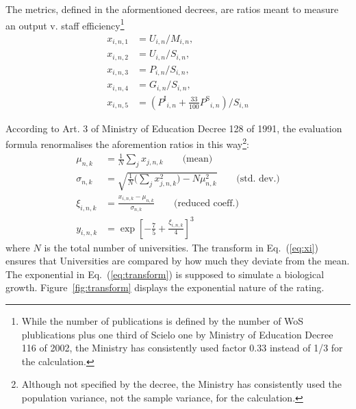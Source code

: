\documentclass[twocolumn]{article}
\def\npup{\ensuremath{U}}
\def\nmaj{\ensuremath{M}}
\def\nprof{\ensuremath{S}}
\def\ngrad{\ensuremath{P}}
\def\ngrant{\ensuremath{G}}
\def\nisi{\ensuremath{P^\text{I}}}
\def\nscielo{\ensuremath{P^\text{S}}}
\def\eqref#1{Eq.~(\ref{eq:#1})}
\begin{document}
The metrics, defined in the aformentioned decrees, are ratios meant to measure an output v. staff efficiency\footnote{While the number of publications is defined by the number of WoS plublications plus one third of Scielo one by Ministry of Education Decree 116 of 2002, the Ministry has consistently used factor 0.33 instead of 1/3 for the calculation.}
\begin{subequations}
\begin{align}
    x_{i,n,1} &= \npup_{i,n} / \nmaj_{i,n},  \label{eq:x1}             \\
    x_{i,n,2} &= \npup_{i,n} / \nprof_{i,n},                           \\ 
    x_{i,n,3} &= \ngrad_{i,n} / \nprof_{i,n},                          \\
    x_{i,n,4} &= \ngrant_{i,n} / \nprof_{i,n},                         \\
    x_{i,n,5} &= (\nisi_{i,n} + \frac{33}{100} \nscielo_{i,n}) / \nprof_{i,n}
\end{align}
\end{subequations}

According to Art. 3 of Ministry of Education Decree 128 of 1991,  the
evaluation formula renormalises the aforemention ratios in this
way\footnote{Although not specified by the decree, the Ministry has
consistently used the population variance, not the sample variance, for the calculation.}:
\begin{subequations}
\begin{align}
    \mu_{n,k}    &= \frac1N\sum_j x_{j,n,k}\qquad\text{(mean)} \label{eq:mu}\\
    \sigma_{n,k} &= \sqrt{\frac 1N \Big(\sum_j x_{j,n,k}^2\Big) - N\mu_{n,k}^2}\qquad\text{(std. dev.)} \label{eq:sigma}\\
    \xi_{i,n,k}  &= \frac{x_{i,n,k} - \mu_{n,k} }{\sigma_{n,k}} 
\qquad\text{(reduced coeff.)} \label{eq:xi}\\
    y_{i,n,k}    &= \exp \left[ -\frac 75 + \frac{\xi_{i,n,k}}4  \right]^3 \label{eq:transform}
\end{align}
\end{subequations}
where $N$ is the total number of universities.
The transform in \eqref{xi} ensures that Universities are compared by how much they deviate from the mean. The exponential in \eqref{transform} is supposed to simulate a biological growth. Figure~\ref{fig:transform} displays the exponential nature of the rating.
\end{document}
